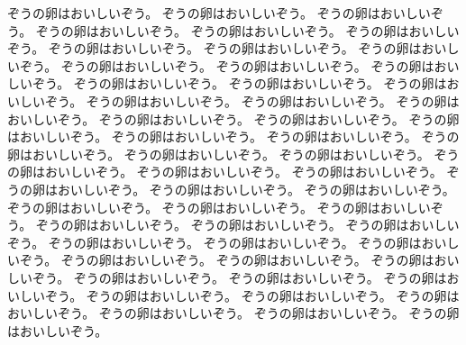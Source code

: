 ぞうの卵はおいしいぞう。
ぞうの卵はおいしいぞう。
ぞうの卵はおいしいぞう。
ぞうの卵はおいしいぞう。
ぞうの卵はおいしいぞう。
ぞうの卵はおいしいぞう。
ぞうの卵はおいしいぞう。
ぞうの卵はおいしいぞう。
ぞうの卵はおいしいぞう。
ぞうの卵はおいしいぞう。
ぞうの卵はおいしいぞう。
ぞうの卵はおいしいぞう。
ぞうの卵はおいしいぞう。
ぞうの卵はおいしいぞう。
ぞうの卵はおいしいぞう。
ぞうの卵はおいしいぞう。
ぞうの卵はおいしいぞう。
ぞうの卵はおいしいぞう。
ぞうの卵はおいしいぞう。
ぞうの卵はおいしいぞう。
ぞうの卵はおいしいぞう。
ぞうの卵はおいしいぞう。
ぞうの卵はおいしいぞう。
ぞうの卵はおいしいぞう。
ぞうの卵はおいしいぞう。
ぞうの卵はおいしいぞう。
ぞうの卵はおいしいぞう。
ぞうの卵はおいしいぞう。
ぞうの卵はおいしいぞう。
ぞうの卵はおいしいぞう。
ぞうの卵はおいしいぞう。
ぞうの卵はおいしいぞう。
ぞうの卵はおいしいぞう。
ぞうの卵はおいしいぞう。
ぞうの卵はおいしいぞう。
ぞうの卵はおいしいぞう。
ぞうの卵はおいしいぞう。
ぞうの卵はおいしいぞう。
ぞうの卵はおいしいぞう。
ぞうの卵はおいしいぞう。
ぞうの卵はおいしいぞう。
ぞうの卵はおいしいぞう。
ぞうの卵はおいしいぞう。
ぞうの卵はおいしいぞう。
ぞうの卵はおいしいぞう。
ぞうの卵はおいしいぞう。
ぞうの卵はおいしいぞう。
ぞうの卵はおいしいぞう。
ぞうの卵はおいしいぞう。
ぞうの卵はおいしいぞう。
ぞうの卵はおいしいぞう。
ぞうの卵はおいしいぞう。
ぞうの卵はおいしいぞう。

